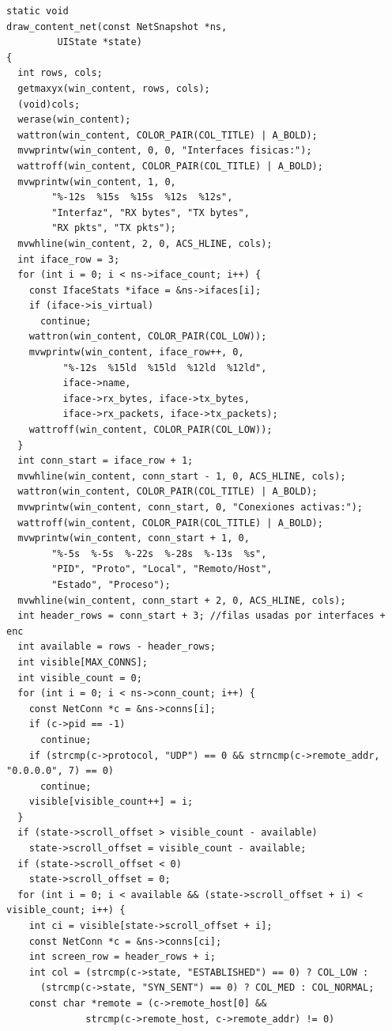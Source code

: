 \documentclass[12pt,letterpaper]{article}
\begin{document}
\begin{lstlisting}[style=modernc, caption={\texttt{ui.c} draw\_content\_net()}]
static void
draw_content_net(const NetSnapshot *ns,
		 UIState *state)
{
  int rows, cols;
  getmaxyx(win_content, rows, cols);
  (void)cols;
  werase(win_content);
  wattron(win_content, COLOR_PAIR(COL_TITLE) | A_BOLD);
  mvwprintw(win_content, 0, 0, "Interfaces fisicas:");
  wattroff(win_content, COLOR_PAIR(COL_TITLE) | A_BOLD);
  mvwprintw(win_content, 1, 0,
	    "%-12s  %15s  %15s  %12s  %12s",
	    "Interfaz", "RX bytes", "TX bytes",
	    "RX pkts", "TX pkts");
  mvwhline(win_content, 2, 0, ACS_HLINE, cols);
  int iface_row = 3;
  for (int i = 0; i < ns->iface_count; i++) {
    const IfaceStats *iface = &ns->ifaces[i];
    if (iface->is_virtual)
      continue;
    wattron(win_content, COLOR_PAIR(COL_LOW));
    mvwprintw(win_content, iface_row++, 0,
	      "%-12s  %15ld  %15ld  %12ld  %12ld",
	      iface->name,
	      iface->rx_bytes, iface->tx_bytes,
	      iface->rx_packets, iface->tx_packets);
    wattroff(win_content, COLOR_PAIR(COL_LOW));
  }
  int conn_start = iface_row + 1;
  mvwhline(win_content, conn_start - 1, 0, ACS_HLINE, cols);
  wattron(win_content, COLOR_PAIR(COL_TITLE) | A_BOLD);
  mvwprintw(win_content, conn_start, 0, "Conexiones activas:");
  wattroff(win_content, COLOR_PAIR(COL_TITLE) | A_BOLD);
  mvwprintw(win_content, conn_start + 1, 0,
	    "%-5s  %-5s  %-22s  %-28s  %-13s  %s",
	    "PID", "Proto", "Local", "Remoto/Host",
	    "Estado", "Proceso");
  mvwhline(win_content, conn_start + 2, 0, ACS_HLINE, cols);
  int header_rows = conn_start + 3; //filas usadas por interfaces + enc
  int available = rows - header_rows;
  int visible[MAX_CONNS];
  int visible_count = 0;
  for (int i = 0; i < ns->conn_count; i++) {
    const NetConn *c = &ns->conns[i];
    if (c->pid == -1)
      continue;
    if (strcmp(c->protocol, "UDP") == 0 && strncmp(c->remote_addr, "0.0.0.0", 7) == 0)
      continue;
    visible[visible_count++] = i;
  }
  if (state->scroll_offset > visible_count - available)
    state->scroll_offset = visible_count - available;
  if (state->scroll_offset < 0)
    state->scroll_offset = 0;
  for (int i = 0; i < available && (state->scroll_offset + i) < visible_count; i++) {
    int ci = visible[state->scroll_offset + i];
    const NetConn *c = &ns->conns[ci];
    int screen_row = header_rows + i;
    int col = (strcmp(c->state, "ESTABLISHED") == 0) ? COL_LOW :
      (strcmp(c->state, "SYN_SENT") == 0) ? COL_MED : COL_NORMAL;
    const char *remote = (c->remote_host[0] &&
			  strcmp(c->remote_host, c->remote_addr) != 0)

\end{lstlisting}
\end{document}
